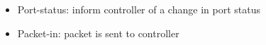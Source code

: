 \begin{itemize}
\begin{itemize}
\begin{itemize}
            \begin{itemize}

              \item Port-status: inform controller of a change in port status

              \item Packet-in: packet is sent to controller

            \end{itemize}

        \end{itemize}

    \end{itemize}

\end{itemize}




